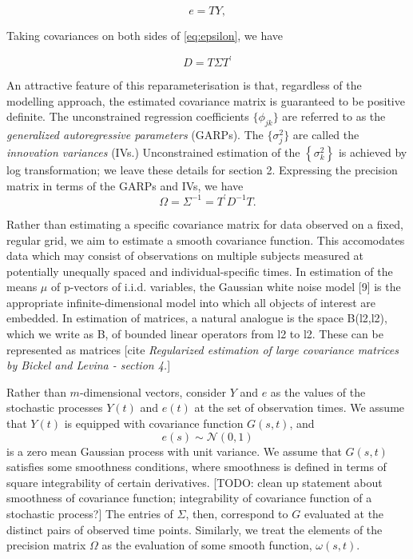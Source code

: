 \documentclass[12pt]{article}
\theoremstyle{definition}
\begin{document}
\begin{equation}
e = T Y, \label{eq:epsilon}
\end{equation}
\noindent

Taking covariances on both sides of \ref{eq:epsilon}, we have

\begin{equation} \label{eq:cholesky_decomp}
D = T \Sigma T^\prime
\end{equation} 

An attractive feature of this reparameterisation is that, regardless of the modelling approach, the estimated covariance matrix is guaranteed to be positive definite. The unconstrained regression coefficients $\lbrace \phi_{jk} \rbrace$ are referred to as the \emph{generalized autoregressive parameters} (GARPs). The $\lbrace \sigma^2_{j} \rbrace$ are called the \emph{innovation variances} (IVs.)  Unconstrained estimation of the $\left\{ \sigma_{k}^2 \right\}$ is achieved by log transformation;  we leave these details for section 2. Expressing the precision matrix  in terms of the GARPs and IVs, we have
\begin{equation*} \label{eq:omega_decomp}
\Omega= \Sigma^{-1} = T^\prime D^{-1} T.
\end{equation*}

Rather than estimating a specific covariance matrix for data observed on a fixed, regular grid, we aim to estimate a smooth covariance function. This accomodates data which may consist of  observations on multiple subjects measured at potentially unequally spaced and individual-specific times. In estimation of the means $\mu$ of p-vectors of i.i.d. variables, the
Gaussian white noise model [9] is the appropriate infinite-dimensional model into
which all objects of interest are embedded. In estimation of matrices, a natural
analogue is the space B(l2,l2), which we write as B, of bounded linear operators
from l2 to l2. These can be represented as matrices [cite \textit{Regularized estimation of large covariance matrices by Bickel and Levina - section 4.}]

Rather than $m$-dimensional vectors, consider $Y$ and $e$ as the values of the stochastic processes $Y\left(t\right)$ and $e\left(t\right)$ at the set of observation times.  We assume that $Y\left(t\right)$ is equipped with covariance function $G\left(s,t\right)$, and
\[
e\left(s\right) \sim \mathcal{N}\left(0,1\right)
\] 
is a zero mean Gaussian process with unit variance. We assume that $G\left(s,t\right)$ satisfies some smoothness conditions, where smoothness is defined in terms of square integrability of certain derivatives. [TODO: clean up statement about smoothness of covariance function; integrability of covariance function of a stochastic process?] The entries of $\Sigma$, then, correspond to $G$ evaluated at the distinct pairs of observed time points. Similarly, we treat the elements of the precision matrix $\Omega$ as the evaluation of some smooth function, $\omega\left(s,t\right)$.
\end{document}
